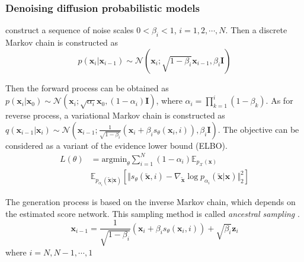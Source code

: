\subsubsection{Denoising diffusion probabilistic models}
\cite{sohl2015deep,ho2020denoising} construct a sequence of noise scales $0<\beta_i<1$, $i=1,2,\cdots,N$. Then a discrete Markov chain is constructed as
 \begin{equation}\label{DDPM_D}
 p(\textbf{x}_i|\textbf{x}_{i-1})\sim \mathcal{N}(\textbf{x}_i; \sqrt{1-\beta_i}\textbf{x}_{i-1}, \beta_i\textbf{I})
 \end{equation}
 
 Then the forward process can be obtained as $p(\textbf{x}_i|\textbf{x}_0)\sim\mathcal{N}(\textbf{x}_i;\sqrt{\alpha_i}\textbf{x}_0, (1-\alpha_i)\textbf{I})$, where $\alpha_i=\prod_{k=1}^i(1-\beta_k)$. As for reverse process, a variational Markov chain is constructed as $q(\textbf{x}_{i-1}|\textbf{x}_i)\sim \mathcal{N}(\textbf{x}_{i-1}; \frac{1}{\sqrt{1-\beta_i}}(\textbf{x}_i + \beta_is_{\theta}(\textbf{x}_i, i)), \beta_i\textbf{I})$. The objective can be considered as a variant of the evidence lower bound (ELBO).
\begin{equation}\label{ddpm_loss}
	\begin{aligned}
			L(\theta)&=\text{argmin}_{\theta}\sum^N_{i=1}(1-\alpha_i)  \mathbb{E}_{p_{\mathcal{X}}(\textbf{x})}\\
		&\mathbb{E}_{p_{\alpha_i}(\tilde{\textbf{x}}|\textbf{x})}[\Vert s_{\theta}(\tilde{\textbf{x}}, i)-\nabla_{\tilde{\textbf{x}}}\log p_{\alpha_i}(\tilde{\textbf{x}}|\textbf{x})\Vert^2_2]
	\end{aligned}
\end{equation}

The generation process is based on the inverse Markov chain, which depends on the estimated score network. This sampling method is called \textit{ancestral sampling} \cite{song2020score}.
\begin{equation}\label{ddpm_sample}
	\textbf{x}_{i-1}=\frac{1}{\sqrt{1-\beta_i}}(\textbf{x}_i + \beta_i s_{\theta}(\textbf{x}_i, i)) + \sqrt{\beta_i}\textbf{z}_i
\end{equation}
where $i=N, N-1,\cdots,1$


